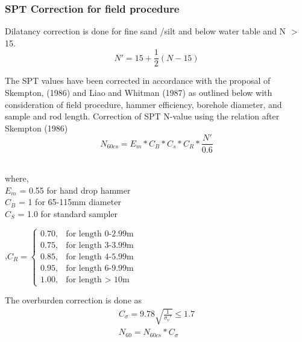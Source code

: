 \subsubsection{SPT Correction for field procedure}
Dilatancy correction is done for fine sand /silt and below water table and N $>$ 15.
\begin{equation}
N'= 15 + \frac{1}{2} (N - 15)
\end{equation}

The SPT values have been corrected in accordance with the proposal of Skempton, (1986) and Liao and Whitman (1987) as outlined below with consideration of field procedure, hammer efficiency, borehole diameter, and sample and rod length. Correction of SPT N-value using the relation after Skempton (1986) \cite{panthi_bearing_2018}
\begin{equation}
N_{60cs}= E_m * C_B * C_s * C_R * \frac{N'}{0.6}
\end{equation}\\
\begin{minipage}[t]{0.48\linewidth}
\vspace{0pt}
  where,\\
  $E_m$ = 0.55 for hand drop hammer\\
  $C_B$ = 1 for 65-115mm diameter\\
  $C_S$ = 1.0 for standard sampler\\
\end{minipage}
\hfill
\begin{minipage}[t]{0.48\linewidth}
\vspace{0pt}
,\begin{math}
  C_R = \begin{cases}
    0.70, & \text{for length 0-2.99m} \\
    0.75, & \text{for length 3-3.99m} \\
    0.85, & \text{for length 4-5.99m} \\
	0.95, & \text{for length 6-9.99m} \\
    1.00, & \text{for length $>$ 10m}
    \end{cases}
\end{math}
\end{minipage}

The overburden correction is done as
\begin{gather}
C_\sigma = 9.78 \sqrt{ \frac{1}{\sigma_v'} } \le 1.7 \\ 
N_{60} = N_{60cs} * C_\sigma
\end{gather}

